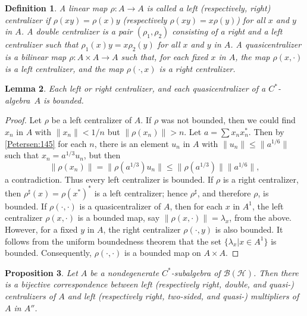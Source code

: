 \documentclass{book}
\newtheorem{definition}{Definition}[section]
\newtheorem{lemma}[definition]{Lemma}
\newtheorem{proposition}[definition]{Proposition}
\def\cstar{\(C^*\)-algebra}
\begin{document}
\begin{definition}
  A linear map \(\rho:A\rightarrow A\) is called a \textnormal{left} (respectively, \textnormal{right})
   \textnormal{centralizer} if \(\rho(xy)=\rho(x)y\) (respectively \(\rho(xy)=x\rho(y)\)) for all \(x\) and \(y\)
   in \(A\). A \textnormal{double centralizer} is a pair \((\rho_1,\rho_2)\) consisting of a right and a left centralizer such that
   \(\rho_1(x)y=x\rho_2(y)\) for all \(x\) and \(y\) in \(A\). A \textnormal{quasicentralizer} is a bilinear map \(\rho:A\times A\rightarrow A\)
   such that, for each fixed \(x\) in \(A\), the map \(\rho(x,\cdot)\) is a left centralizer, and the map \(\rho(\cdot,x)\) is a right centralizer. 
\end{definition}
\begin{lemma}\label{Petersen:3122}
  Each left or right centralizer, and each quasicentralizer of a \cstar\ \(A\) is bounded.
\end{lemma}
\begin{proof}
  Let \(\rho\) be a left centralizer of \(A\). If \(\rho\) was not bounded, then we could find
  \(x_n\) in \(A\) with \(\|x_n\|<1/n\) but \(\|\rho(x_n)\|>n\).
  Let \(a=\sum x_n x_n^*\). Then by \ref{Petersen:145} for each \(n\), there is an element \(u_n\)
  in \(A\) with \(\|u_n\|\leq\|a^{1/6}\|\) such that \(x_n=a^{1/3}u_n\), but then
  \[
    \|\rho(x_n)\|=\|\rho(a^{1/3})u_n\|\leq\|\rho(a^{1/3})\|\|a^{1/6}\|,
  \]
  a contradiction. Thus every left centralizer is bounded. If \(\rho\) is a right centralizer, then
  \(\rho^\sharp(x)=\rho(x^*)^*\) is a left centralizer; hence \(\rho^\sharp\), and therefore \(\rho\), is bounded.
  If \(\rho(\cdot,\cdot)\) is a quasicentralizer of \(A\), then for each 
  \(x\) in \(A^1\), the left centralizer \(\rho(x,\cdot)\) is a bounded map, say \(\|\rho(x,\cdot)\|=\lambda_x\), from the above.
  However, for a fixed \(y\) in \(A\), the right centralizer \(\rho(\cdot,y)\) is also bounded.
  It follows from the uniform boundedness theorem that the set \(\{\lambda_x| x\in A^1\}\) is bounded.
  Consequently, \(\rho(\cdot,\cdot)\) is a bounded map on \(A\times A\).
\end{proof}
\begin{proposition}\label{Petersen:3123}
  Let \(A\) be a nondegenerate \(C^*\)-subalgebra of \(\mathcal{B}(\mathcal{H})\).
  Then there is a bijective correspondence between left (respectively right, double, and quasi-)
  centralizers of \(A\) and left (respectively right, two-sided, and quasi-) multipliers of \(A\) in \(A''\).
\end{proposition}
\end{document}
